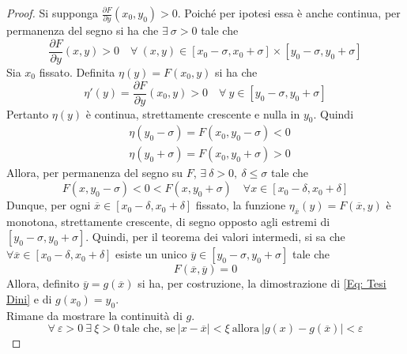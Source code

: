 \begin{proof}
        Si supponga $\frac{\partial{F}}{\partial{y}}(x_0,y_0) > 0$. Poiché per ipotesi essa è anche continua, per permanenza del segno si ha che $\exists\ \sigma > 0$ tale che
        \begin{equation*}
            \frac{\partial{F}}{\partial{y}}(x,y) > 0 \quad \forall\ (x,y) \in [x_0-\sigma, x_0+\sigma]\times [y_0 - \sigma, y_0+\sigma]
        \end{equation*}
       Sia $x_0$ fissato. Definita $\eta(y)=F(x_0, y)$ si ha che
       \begin{equation*}
           \eta'(y)=\frac{\partial{F}}{\partial{y}}(x_0, y) >0 \quad \forall\ y \in [y_0 - \sigma, y_0+\sigma]
       \end{equation*}
       Pertanto $\eta(y)$ è continua, strettamente crescente e nulla in $y_0$. Quindi
       \begin{equation*}
       \begin{aligned}
           &\eta(y_0-\sigma)=F(x_0, y_0-\sigma)<0\\
           &\eta(y_0+\sigma)=F(x_0, y_0+\sigma)>0
       \end{aligned}
       \end{equation*}
       Allora, per permanenza del segno su $F$, $\exists\ \delta>0,\ \delta \leq \sigma$ tale che 
       \begin{equation*}
           F(x, y_0-\sigma) < 0 < F(x, y_0+\sigma) \quad \forall x \in [x_0-\delta, x_0+\delta]
       \end{equation*}
       Dunque, per ogni $\overline{x} \in [x_0-\delta, x_0+\delta]$ fissato, la funzione $\eta_{\overline{x}}(y)=F(\overline{x}, y)$ è monotona, strettamente crescente, di segno opposto agli estremi di $[y_0 - \sigma, y_0+\sigma]$. Quindi, per il teorema dei valori intermedi, si sa che $\forall \overline{x} \in [x_0-\delta, x_0+\delta]$ esiste un unico $\overline{y} \in [y_0-\sigma, y_0+\sigma]$ tale che 
       \begin{equation*}
           F(\overline{x}, \overline{y})=0
       \end{equation*}
       Allora, definito $\overline{y}=g(\overline{x})$ si ha, per costruzione, la dimostrazione di \eqref{Eq: Tesi Dini} e di $g(x_0)=y_0$.\\
       Rimane da mostrare la continuità di $g$.
       \begin{equation*}
           \forall\ \varepsilon > 0\ \exists\ \xi > 0\ \text{tale che, se}\ |x-\overline{x}|< \xi\ \text{allora}\ |g(x)-g(\overline{x})| < \varepsilon

\end{equation*}
\end{proof}
